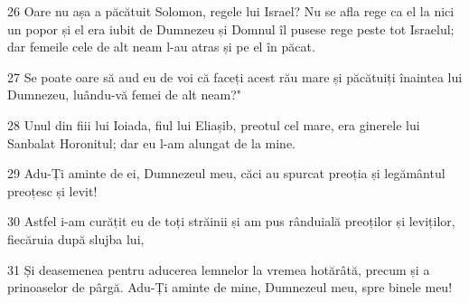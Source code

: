 \par 26 Oare nu așa a păcătuit Solomon, regele lui Israel? Nu se afla rege ca el la nici un popor și el era iubit de Dumnezeu și Domnul îl pusese rege peste tot Israelul; dar femeile cele de alt neam l-au atras și pe el în păcat.
\par 27 Se poate oare să aud eu de voi că faceți acest rău mare și păcătuiți înaintea lui Dumnezeu, luându-vă femei de alt neam?"
\par 28 Unul din fiii lui Ioiada, fiul lui Eliașib, preotul cel mare, era ginerele lui Sanbalat Horonitul; dar eu l-am alungat de la mine.
\par 29 Adu-Ți aminte de ei, Dumnezeul meu, căci au spurcat preoția și legământul preoțesc și levit!
\par 30 Astfel i-am curățit eu de toți străinii și am pus rânduială preoților și leviților, fiecăruia după slujba lui,
\par 31 Și deasemenea pentru aducerea lemnelor la vremea hotărâtă, precum și a prinoaselor de pârgă. Adu-Ți aminte de mine, Dumnezeul meu, spre binele meu!


